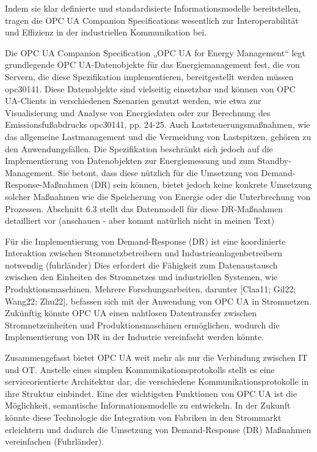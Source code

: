 Indem sie klar definierte und standardisierte Informationsmodelle bereitstellen, tragen die OPC UA Companion Specifications wesentlich zur Interoperabilität und Effizienz in der industriellen Kommunikation bei.

Die OPC UA Companion Specification „OPC UA for Energy Management“ legt grundlegende OPC UA-Datenobjekte für das Energiemanagement fest, die von Servern, die diese Spezifikation implementieren, bereitgestellt werden müssen {opc30141}. Diese Datenobjekte sind vielseitig einsetzbar und können von OPC UA-Clients in verschiedenen Szenarien genutzt werden, wie etwa zur Visualisierung und Analyse von Energiedaten oder zur Berechnung des Emissionsfußabdrucks {opc30141, pp. 24-25}. Auch Laststeuerungsmaßnahmen, wie das allgemeine Lastmanagement und die Vermeidung von Lastspitzen, gehören zu den Anwendungsfällen. Die Spezifikation beschränkt sich jedoch auf die Implementierung von Datenobjekten zur Energiemessung und zum Standby-Management. Sie betont, dass diese nützlich für die Umsetzung von Demand-Response-Maßnahmen (DR) sein können, bietet jedoch keine konkrete Umsetzung solcher Maßnahmen wie die Speicherung von Energie oder die Unterbrechung von Prozessen. Abschnitt 6.3 stellt das Datenmodell für diese DR-Maßnahmen detailliert vor (anschauen - aber kommt natürlich nicht in meinen Text)

Für die Implementierung von Demand-Response (DR) ist eine koordinierte Interaktion zwischen Stromnetzbetreibern und Industrieanlagenbetreibern notwendig (fuhrländer) Dies erfordert die Fähigkeit zum Datenaustausch zwischen den Einheiten des Stromnetzes und industriellen Systemen, wie Produktionsmaschinen. Mehrere Forschungsarbeiten, darunter [Claa11; Gil22; Wang22; Zhu22], befassen sich mit der Anwendung von OPC UA in Stromnetzen. Zukünftig könnte OPC UA einen nahtlosen Datentransfer zwischen Stromnetzeinheiten und Produktionsmaschinen ermöglichen, wodurch die Implementierung von DR in der Industrie vereinfacht werden könnte.

Zusammengefasst bietet OPC UA weit mehr als nur die Verbindung zwischen IT und OT. Anstelle eines simplen Kommunikationsprotokolls stellt es eine serviceorientierte Architektur dar, die verschiedene Kommunikationsprotokolle in ihre Struktur einbindet. Eine der wichtigsten Funktionen von OPC UA ist die Möglichkeit, semantische Informationsmodelle zu entwickeln. In der Zukunft könnte diese Technologie die Integration von Fabriken in den Strommarkt erleichtern und dadurch die Umsetzung von Demand-Response (DR) Maßnahmen vereinfachen (Fuhrländer).